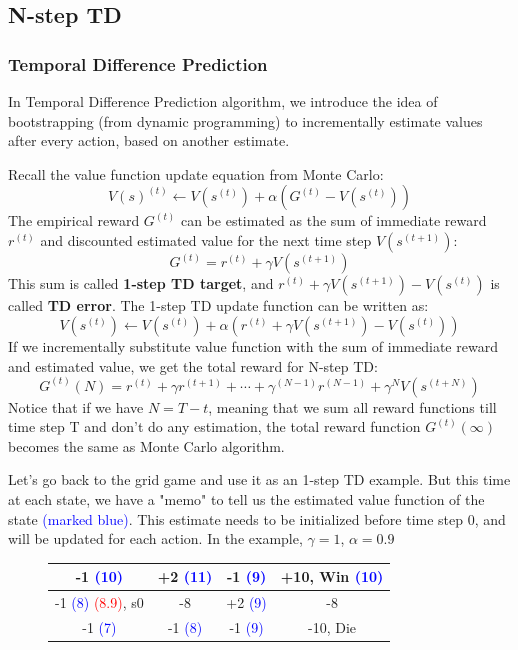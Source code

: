 \documentclass[11pt]{article}
\begin{document}
\subsection{N-step TD}
\subsubsection{Temporal Difference Prediction}
In Temporal Difference Prediction algorithm, we introduce the idea of bootstrapping (from dynamic programming) to incrementally estimate values after every action, based on another estimate.

Recall the value function update equation from Monte Carlo:
\begin{equation}
V(s)^{(t)} \leftarrow V(s^{(t)}) + \alpha (G^{(t)} - V(s^{(t)}))
\end{equation}
The empirical reward $G^{(t)}$ can be estimated as the sum of immediate reward $r^{(t)}$ and discounted estimated value for the next time step $V(s^{(t+1)})$:
\begin{equation} \label{1s_td_target}
G^{(t)} = r^{(t)} + \gamma V(s^{(t+1)})
\end{equation}
This sum is called \textbf{1-step TD target}, and $r^{(t)} + \gamma V(s^{(t+1)}) - V(s^{(t)})$ is called \textbf{TD error}. The 1-step TD update function can be written as:
\begin{equation} \label{1s_td_update}
V(s^{(t)}) \leftarrow V(s^{(t)}) + \alpha (r^{(t)} + \gamma V(s^{(t+1)}) - V(s^{(t)}))
\end{equation}
If we incrementally substitute value function with the sum of immediate reward and estimated value, we get the total reward for N-step TD:
\begin{equation}
G^{(t)}(N) = r^{(t)} + \gamma r^{(t+1)} + \cdots + \gamma ^{(N-1)} r^{(N-1)} +\gamma ^ N V(s^{(t + N)})
\end{equation}
Notice that if we have $N=T-t$, meaning that we sum all reward functions till time step T and don't do any estimation, the total reward function $G^{(t)}(\infty)$ becomes the same as Monte Carlo algorithm.

Let's go back to the grid game and use it as an 1-step TD example. But this time at each state, we have a "memo" to tell us the estimated value function of the state \textcolor{blue}{(marked blue)}. This estimate needs to be initialized before time step 0, and will be updated for each action. In the example, $\gamma=1$, $\alpha=0.9$
\begin{figure}[h]
\centering
\begin{tabular}{| c | c | c | c |}
\hline
-1 \textcolor{blue}{(10)} & +2 \textcolor{blue}{(11)} & -1 \textcolor{blue}{(9)} & +10, Win \textcolor{blue}{(10)} \\
\hline
-1 \textcolor{blue}{(8)} \textcolor{red}{(8.9)}, s0 & -8 & +2 \textcolor{blue}{(9)} & -8 \\
\hline
-1 \textcolor{blue}{(7)} & -1 \textcolor{blue}{(8)} & -1 \textcolor{blue}{(9)} & -10, Die \\
\hline
\end{tabular}
\end{figure}
\end{document}
